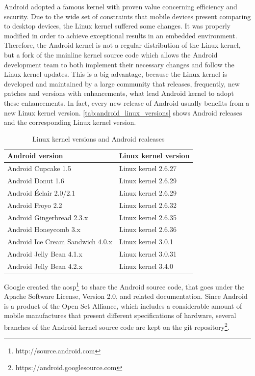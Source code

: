 Android adopted a famous kernel with proven value concerning efficiency and security. Due to the wide set of constraints that mobile devices present comparing to desktop devices, the Linux kernel suffered some changes. It was properly modified in order to achieve exceptional results in an embedded environment. Therefore, the Android kernel is not a regular distribution of the Linux kernel, but a fork of the mainline kernel source code which allows the Android development team to both implement their necessary changes and follow the Linux kernel updates. This is a big advantage, because the Linux kernel is developed and maintained by a large community that releases, frequently, new patches and versions with enhancements, what lead Android kernel to adopt these enhancements. In fact, every new release of Android usually benefits from a new Linux kernel version. \autoref{tab:android_linux_versions} shows Android releases and the corresponding Linux kernel version.

\begin{table}
\begin{center}
\begin{tabular}{| l | l |}
\hline
\textbf{Android version} & \textbf{Linux kernel version} \\
\hline
Android Cupcake 1.5 & Linux kernel 2.6.27 \\
\hline
Android Donut 1.6 & Linux kernel 2.6.29\\
\hline
Android Éclair 2.0/2.1 & Linux kernel 2.6.29\\
\hline
Android Froyo 2.2 & Linux kernel 2.6.32\\
\hline
Android Gingerbread 2.3.x & Linux kernel 2.6.35\\
\hline
Android Honeycomb 3.x & Linux kernel 2.6.36\\
\hline
Android Ice Cream Sandwich 4.0.x & Linux kernel 3.0.1\\
\hline
Android Jelly Bean 4.1.x & Linux kernel 3.0.31\\
\hline
Android Jelly Bean 4.2.x & Linux kernel 3.4.0\\
\hline
\end{tabular}
\end{center}
\caption{Linux kernel versions and Android realeases}
\label{tab:android_linux_versions}
\end{table}

Google created the \gls{aosp}\footnote{http://source.android.com} to share the Android source code, that goes under the Apache Software License, Version 2.0, and related documentation. Since Android is a product of the Open Set Alliance, which includes a considerable amount of mobile manufactures that present different specifications of hardware, several branches of the Android kernel source code are kept on the git repository\footnote{https://android.googlesource.com}.

